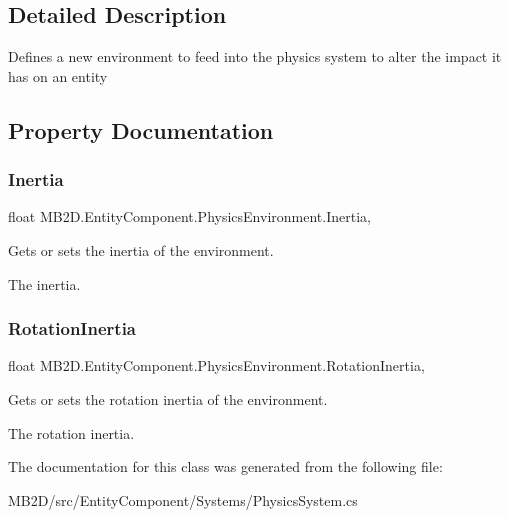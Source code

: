 \subsection{Detailed Description}
Defines a new environment to feed into the physics system to alter the impact it has on an entity 



\subsection{Property Documentation}
\hypertarget{class_m_b2_d_1_1_entity_component_1_1_physics_environment_a67ab743dbbe138e3eac38871e51c21d6}{}\label{class_m_b2_d_1_1_entity_component_1_1_physics_environment_a67ab743dbbe138e3eac38871e51c21d6} 
\subsubsection{\texorpdfstring{Inertia}{Inertia}}
{\footnotesize\ttfamily float M\+B2\+D.\+Entity\+Component.\+Physics\+Environment.\+Inertia\hspace{0.3cm}{\ttfamily [get]}, {\ttfamily [set]}}



Gets or sets the inertia of the environment. 

The inertia.\hypertarget{class_m_b2_d_1_1_entity_component_1_1_physics_environment_a1c2fdbef41b7dee04b59200dd5d90cdc}{}\label{class_m_b2_d_1_1_entity_component_1_1_physics_environment_a1c2fdbef41b7dee04b59200dd5d90cdc} 
\subsubsection{\texorpdfstring{Rotation\+Inertia}{RotationInertia}}
{\footnotesize\ttfamily float M\+B2\+D.\+Entity\+Component.\+Physics\+Environment.\+Rotation\+Inertia\hspace{0.3cm}{\ttfamily [get]}, {\ttfamily [set]}}



Gets or sets the rotation inertia of the environment. 

The rotation inertia.

The documentation for this class was generated from the following file\+:\begin{DoxyCompactItemize}
\item 
M\+B2\+D/src/\+Entity\+Component/\+Systems/Physics\+System.\+cs\end{DoxyCompactItemize}
